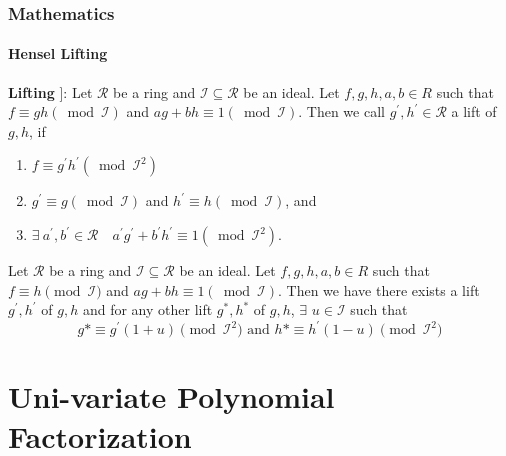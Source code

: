 \documentclass[10pt]{beamer}
\begin{document}
\begin{frame}
	\frametitle{Mathematics}
 \framesubtitle{Hensel Lifting}
	\textbf{Lifting} {\cite[Section 4.1]{abpfactor}}]: Let $\mathcal{R}$ be a ring and $\mathcal{I} \subseteq \mathcal{R}$ be an ideal. Let $f, g, h, a, b \in R$ such that $f \equiv g h(\bmod \mathcal{I})$ and $a g+b h \equiv 1(\bmod \mathcal{I})$. Then we call $g^{\prime}, h^{\prime} \in \mathcal{R}$ a lift of $g, h$, if
	    \begin{enumerate}
\item $f \equiv g^{\prime} h^{\prime}\left(\bmod \mathcal{I}^2\right)$
\item ${g}^{\prime} \equiv  {g}(\bmod \mathcal{I})$ and $h^{\prime} \equiv h(\bmod \mathcal{I})$, and
\item $\exists\ a^{\prime}, b^{\prime} \in \mathcal{R} \quad a^{\prime} g^{\prime}+ {b}^{\prime} h^{\prime} \equiv 1\left(\bmod \mathcal{I}^2\right)$.
\end{enumerate}

 \begin{theorem}
		Let $\mathcal{R}$ be a ring and $\mathcal{I} \subseteq \mathcal{R}$ be an ideal. Let $f, g, h, a, b \in R$ such that $f \equiv h\pmod{\mathcal{I}}$ and ${ag}+{bh} \equiv 1(\bmod \mathcal{I})$. Then we have there exists a lift ${g}^{\prime}, h^{\prime}$ of $g, h$ and for any other lift ${g}^*, h^*$ of ${g}, {h}$, $\exists$ ${u} \in \mathcal{I}$ such that $$g*\equiv g^{\prime}(1+u) \pmod  {\mathcal{I}^2} \text{ and } h* \equiv h^{\prime}(1-u) \pmod {\mathcal{I}^2}$$
\end{theorem}

\end{frame}

\section{Uni-variate Polynomial Factorization}
\end{document}
